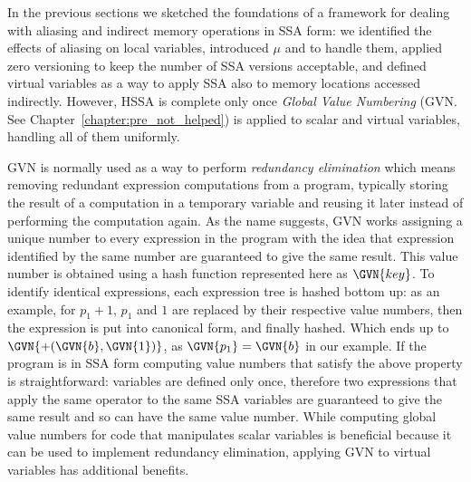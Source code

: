 In the previous sections we sketched the foundations of a framework for dealing with aliasing and indirect memory operations in SSA form: we identified the effects of aliasing on local variables, introduced $\mu$ and \chiops to handle them, applied zero versioning to keep the number of SSA versions acceptable, and defined virtual variables as a way to apply SSA also to memory locations accessed indirectly. However, HSSA is complete only once {\em Global Value Numbering} (GVN. See Chapter~\ref{chapter:pre_not_helped}) is applied to scalar and virtual variables, handling all of them uniformly.

GVN is normally used as a way to perform \emph{redundancy elimination} which means removing redundant expression computations from a program, typically storing the result of a computation in a temporary variable and reusing it later instead of performing the computation again.
As the name suggests, GVN works assigning a unique number to every expression in the program with the idea that expression identified by the same number are guaranteed to give the same result.
This value number is obtained using a hash function represented here as $\GVN{key}$.
To identify identical expressions, each expression tree is hashed bottom up: as an example, for $p_1+1$, $p_1$ and $1$ are replaced by their respective value numbers, then the expression is put into canonical form, and finally hashed. Which ends up to $\GVN{+(\GVN{b},\GVN{1})}$, as $\GVN{p_1}=\GVN{b}$ in our example.
If the program is in SSA form computing value numbers that satisfy the above property is straightforward: variables are defined only once, therefore two expressions that apply the same operator to the same SSA variables are guaranteed to give the same result and so can have the same value number.
While computing global value numbers for code that manipulates scalar variables is beneficial because it can be used to implement redundancy elimination, applying GVN to virtual variables has additional benefits.

